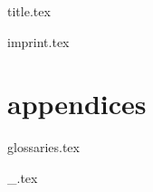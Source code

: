 \documentclass[a4paper,10pt,twocolumn,openany]{book}
\begin{document}
\frontmatter
{title.tex}

\ifauthornotes
  {imprint.tex}
\fi


\twocolumn
\mainmatter


\setcounter{chapter}{0}


\part{appendices}
\appendix
{glossaries.tex}

\ifauthornotes
  {_.tex}
\fi
\end{document}
